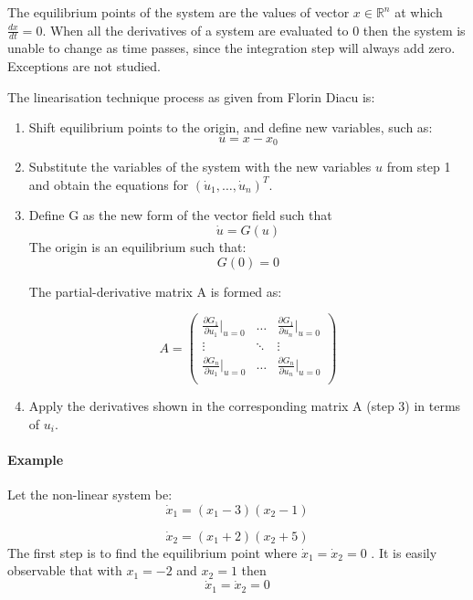 The equilibrium points of the system are the values of vector $x \in \mathbb{R}^n $ at which $ \frac{dx}{dt}=0 $. When all the derivatives of a system are evaluated to 0 then the system is unable to change as time passes, since the integration step will always add zero. Exceptions are not studied.   

The linearisation technique process as given from Florin Diacu \cite[p.~227]{diacu_differential_2000} is:
\begin{enumerate}
\item Shift equilibrium points to the origin, and define new variables, such as:
$$ u=x-x_0 $$
\item Substitute the variables of the system with the new variables $ u $ from step 1 and obtain the equations for $(\dot{u}_1,  \hdots, \dot{u}_n)^T$.
\item Define G as the new form of the vector field such that 
$$ 
\dot{u}=G(u)
$$
The origin is an equilibrium such that:
$$G(0) = 0$$ 

The partial-derivative matrix A is formed as:

$$ A=\begin{pmatrix}
     \frac{\partial G_1}{\partial u_1}|_{u=0} & \hdots & \frac{\partial G_1}{\partial u_n}|_{u=0} \\
     \vdots & \ddots & \vdots \\
    \frac{\partial G_n}{\partial u_1}|_{u=0} & \hdots & \frac{\partial G_n}{\partial u_n}|_{u=0} \\
    \end{pmatrix}
$$

\item Apply the derivatives shown in the corresponding matrix A (step 3) in terms of $u_i$.
\end{enumerate}

\paragraph{Example}

Let the non-linear system be:
\begin{equation}
\label{xoneeq}
\dot{x}_1 = (x_1 - 3)(x_2 - 1)
\end{equation}

\begin{equation}
\label{xtwoeq}
\dot{x}_2 = (x_1 + 2)(x_2+5) 
\end{equation}
The first step is to find the equilibrium point where $ \dot{x}_1 = \dot{x}_2 = 0 $ .
It is easily observable that with $ x_1=-2 $ and $ x_2=1 $ then 
\begin{equation}
\label{eqp}
\dot{x}_1 = \dot{x}_2 = 0
\end{equation}

